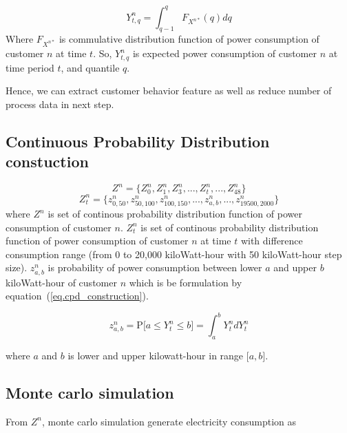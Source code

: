 \documentclass[conference]{IEEEtran}
\begin{document}
\begin{equation}
  Y_{t,q}^{n}=\int_{q-1}^{q} F_{X^{n*}}(q) dq
  \label{eq.quantile_formular}
\end{equation}
Where $F_{X^{n*}}$ is commulative distribution function of power consumption of customer $n$ at time $t$. So, $Y_{t,q}^{n}$ is expected power consumption of customer $n$ at time period $t$, and quantile $q$.

Hence, we can extract customer behavior feature as well as reduce number of process data in next step.

\subsection{Continuous Probability Distribution constuction}

\begin{equation}
Z^{n}=\big\{ Z_{0}^{n}, Z_{1}^{n}, Z_{3}^{n}, ..., Z_{t}^{n}, ..., Z_{48}^{n} \big\}
\label{eq.CPD_customer}
\end{equation}
\begin{equation}
Z_{t}^{n}=\big\{ z_{0,50}^{n}, z_{50,100}^{n}, z_{100,150}^{n}, ..., z_{a,b}^{n}, ..., z_{19500,2000}^{n} \big\}
\label{eq.CPD_customer_at_t}
\end{equation}
where $Z^{n}$ is set of continous probability distribution function of power consumption of customer $n$.
$Z_{t}^{n}$ is set of continous probability distribution function of power consumption of customer $n$ at time $t$ with difference consumption range (from 0 to 20,000 kiloWatt-hour with 50 kiloWatt-hour step size).
$z_{a,b}^{n}$ is probability of power consumption between lower $a$ and upper $b$ kiloWatt-hour of customer $n$ which is be formulation by equation~(\ref{eq.cpd_construction}).


\begin{equation}
z_{a,b}^{n}=\text{P}\big[ a \le Y_{t}^{n} \le b \big] = \int_{a}^{b} Y_{t}^{n}dY_{t}^{n}
\label{eq.cpd_construction}
\end{equation}

where $a$ and $b$ is lower and upper kilowatt-hour in range $\big[ a,b \big]$.

\subsection{Monte carlo simulation}

From $Z^{n}$, monte carlo simulation generate electricity consumption as
\end{document}
